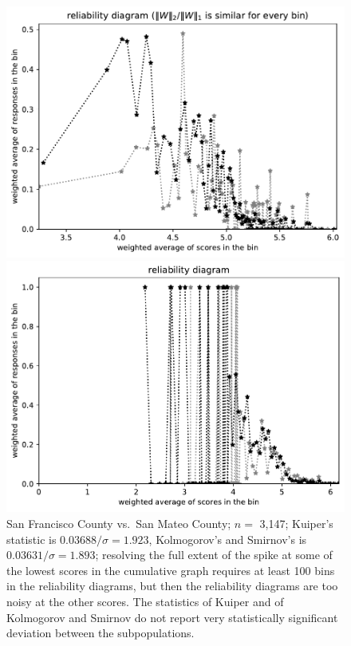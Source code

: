 \documentclass{article}
\newlength{\imsize}
\begin{document}
\begin{figure}
\begin{centering}
\parbox{\imsize}{\includegraphics[width=\imsize]
{../codes/weighted/County_of_San_Francisco_vs_San_Mateo-LNGI/equierrs100.pdf}}
\quad\quad
\parbox{\imsize}{\includegraphics[width=\imsize]
{../codes/weighted/County_of_San_Francisco_vs_San_Mateo-LNGI/equiscores100.pdf}}

\end{centering}
\caption{San Francisco County vs.\ San Mateo County; $n =$ 3,147;
         Kuiper's statistic is $0.03688 / \sigma = 1.923$,
         Kolmogorov's and Smirnov's is $0.03631 / \sigma = 1.893$;
         resolving the full extent of the spike
         at some of the lowest scores in the cumulative graph requires
         at least 100 bins in the reliability diagrams,
         but then the reliability diagrams are too noisy at the other scores.
         The statistics of Kuiper and of Kolmogorov and Smirnov do not report
         very statistically significant deviation between the subpopulations.
}
\label{San_Francisco-San_Mateo}
\end{figure}
\end{document}
